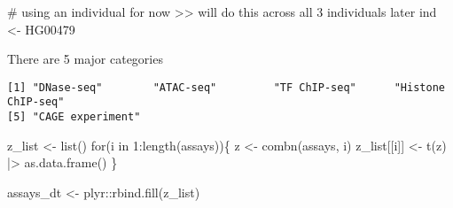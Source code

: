 \documentclass[
  letterpaper,
  DIV=11,
  numbers=noendperiod]{scrartcl}
\newenvironment{Shaded}{\begin{snugshade}}{\end{snugshade}}
\newcommand{\CommentTok}[1]{\textcolor[rgb]{0.37,0.37,0.37}{#1}}
\newcommand{\ControlFlowTok}[1]{\textcolor[rgb]{0.00,0.23,0.31}{#1}}
\newcommand{\DecValTok}[1]{\textcolor[rgb]{0.68,0.00,0.00}{#1}}
\newcommand{\FunctionTok}[1]{\textcolor[rgb]{0.28,0.35,0.67}{#1}}
\newcommand{\NormalTok}[1]{\textcolor[rgb]{0.00,0.23,0.31}{#1}}
\newcommand{\OtherTok}[1]{\textcolor[rgb]{0.00,0.23,0.31}{#1}}
\newcommand{\SpecialCharTok}[1]{\textcolor[rgb]{0.37,0.37,0.37}{#1}}
\newcommand{\StringTok}[1]{\textcolor[rgb]{0.13,0.47,0.30}{#1}}
\begin{document}
\begin{Shaded}
\end{Shaded}

\begin{Shaded}
\begin{Highlighting}[numbers=left,,]
\CommentTok{\# using an individual for now \textgreater{}\textgreater{} will do this across all 3 individuals later}
\NormalTok{ind }\OtherTok{\textless{}{-}} \StringTok{\textquotesingle{}HG00479\textquotesingle{}}
\end{Highlighting}
\end{Shaded}

There are 5 major categories

\begin{Shaded}
\end{Shaded}

\begin{verbatim}
[1] "DNase-seq"        "ATAC-seq"         "TF ChIP-seq"      "Histone ChIP-seq"
[5] "CAGE experiment" 
\end{verbatim}

\begin{Shaded}
\begin{Highlighting}[numbers=left,,]
\NormalTok{z\_list }\OtherTok{\textless{}{-}} \FunctionTok{list}\NormalTok{()}
\ControlFlowTok{for}\NormalTok{(i }\ControlFlowTok{in} \DecValTok{1}\SpecialCharTok{:}\FunctionTok{length}\NormalTok{(assays))\{}
\NormalTok{    z }\OtherTok{\textless{}{-}} \FunctionTok{combn}\NormalTok{(assays, i)}
\NormalTok{    z\_list[[i]] }\OtherTok{\textless{}{-}} \FunctionTok{t}\NormalTok{(z) }\SpecialCharTok{|\textgreater{}} \FunctionTok{as.data.frame}\NormalTok{()}
\NormalTok{\}}

\NormalTok{assays\_dt }\OtherTok{\textless{}{-}}\NormalTok{ plyr}\SpecialCharTok{::}\FunctionTok{rbind.fill}\NormalTok{(z\_list)}
\end{Highlighting}
\end{Shaded}
\end{document}
